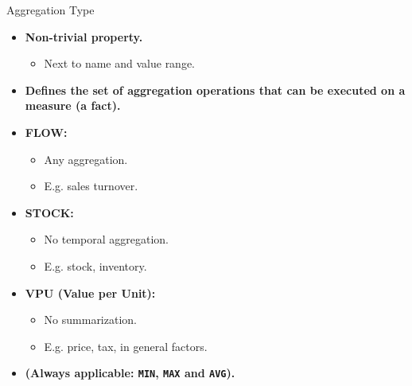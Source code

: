 \begin{frame}{Aggregation Type}
  \begin{itemize}
  \item \textbf{Non-trivial property.}
    \begin{itemize}
    \item Next to name and value range.
    \end{itemize}
  \item \textbf{Defines the set of aggregation operations that can be executed on a measure (a fact).}
  \item \textbf{\color{airforceblue}FLOW:}
    \begin{itemize}
    \item Any aggregation.
    \item E.g. sales turnover.
    \end{itemize}
  \item \textbf{\color{airforceblue}STOCK:}
    \begin{itemize}
    \item No temporal aggregation.
    \item E.g. stock, inventory.
    \end{itemize}
  \item \textbf{\color{airforceblue}VPU (Value per Unit):}
    \begin{itemize}
    \item No summarization.
    \item E.g. price, tax, in general factors.
    \end{itemize}
  \item \textbf{(Always applicable: \texttt{MIN}, \texttt{MAX} and \texttt{AVG}).}
  \end{itemize}
\end{frame}

